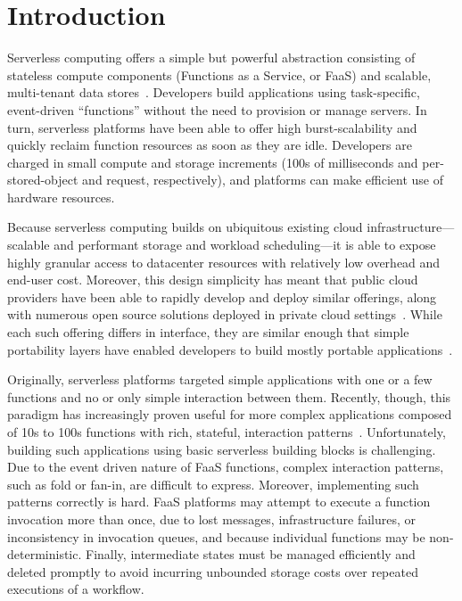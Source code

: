 \section{Introduction}

Serverless computing offers a simple but powerful abstraction consisting of
stateless compute components (Functions as a Service, or FaaS) and scalable,
multi-tenant data stores~\cite{berkeley}. Developers build applications using
task-specific, event-driven ``functions'' without the need to provision or
manage servers. In turn, serverless platforms have been able to offer high
burst-scalability and quickly reclaim function resources as soon as they are
idle. Developers are charged in small compute and storage increments (100s of
milliseconds and per-stored-object and request, respectively), and platforms
can make efficient use of hardware resources.

Because serverless computing builds on ubiquitous existing cloud
infrastructure---scalable and performant storage and workload scheduling---it is
able to expose highly granular access to datacenter resources with relatively
low overhead and end-user cost. Moreover, this design simplicity has meant that
public cloud providers have been able to rapidly develop and deploy similar
offerings, along with numerous open source solutions deployed in private cloud
settings~\cite{aws-lambda,gcp-functions,azure-functions,openwhisk,openfaas}.
While each such offering differs in interface, they are similar enough that
simple portability layers have enabled developers to build mostly portable
applications~\cite{boto3,serverless-framework}.

Originally, serverless platforms targeted simple applications with one or a few
functions and no or only simple interaction between them. Recently, though, this
paradigm has increasingly proven useful for more complex applications composed
of 10s to 100s functions with rich, stateful, interaction
patterns~\cite{excamera, pywren, gg-atc, beldi, boki}. Unfortunately, building
such applications using basic serverless building blocks is challenging.  Due to
the event driven nature of FaaS functions, complex interaction patterns, such as
fold or fan-in, are difficult to express. Moreover, implementing such
patterns correctly is hard. FaaS platforms may attempt to execute a function
invocation more than once, due to lost messages, infrastructure failures, or
inconsistency in invocation queues, and because individual functions may be
non-deterministic. Finally, intermediate states must be managed efficiently and
deleted promptly to avoid incurring unbounded storage costs over repeated
executions of a workflow.

